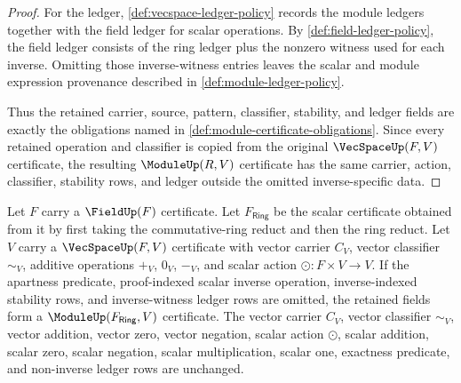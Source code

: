 \begin{proof}
For the ledger, \autoref{def:vecspace-ledger-policy} records the module ledgers together with the field ledger for scalar operations. By \autoref{def:field-ledger-policy}, the field ledger consists of the ring ledger plus the nonzero witness used for each inverse. Omitting those inverse-witness entries leaves the scalar and module expression provenance described in \autoref{def:module-ledger-policy}.

Thus the retained carrier, source, pattern, classifier, stability, and ledger fields are exactly the obligations named in \autoref{def:module-certificate-obligations}. Since every retained operation and classifier is copied from the original $\VecSpaceUp(F,V)$ certificate, the resulting $\ModuleUp(R,V)$ certificate has the same carrier, action, classifier, stability rows, and ledger outside the omitted inverse-specific data.
\end{proof}
\begin{proposition}
\label{prop:vecspace-module-fragment-projection}
Let $F$ carry a $\FieldUp(F)$ certificate. Let $F_{\mathsf{Ring}}$ be the scalar certificate obtained from it by first taking the commutative-ring reduct and then the ring reduct. Let $V$ carry a $\VecSpaceUp(F,V)$ certificate with vector carrier $C_V$, vector classifier $\sim_V$, additive operations $+_V$, $0_V$, $-_V$, and scalar action $\odot:F\times V\to V$. If the apartness predicate, proof-indexed scalar inverse operation, inverse-indexed stability rows, and inverse-witness ledger rows are omitted, the retained fields form a $\ModuleUp(F_{\mathsf{Ring}},V)$ certificate. The vector carrier $C_V$, vector classifier $\sim_V$, vector addition, vector zero, vector negation, scalar action $\odot$, scalar addition, scalar zero, scalar negation, scalar multiplication, scalar one, exactness predicate, and non-inverse ledger rows are unchanged.
\end{proposition}
